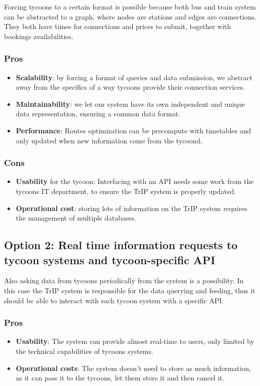 Forcing tycoons to a certain format is possible because both bus and train system can be abstracted to a graph, where nodes are stations and edges are connections.
They both have times for connections and prices to submit, together with bookings availabilities.
\subsubsection*{Pros}
\begin{itemize}[noitemsep]
    \item \textbf{Scalability}: by forcing a format of queries and data submission, we abstract away from the specifics of a way tycoons provide their connection services.
    \item \textbf{Maintainability}: we let our system have its own independent and unique data representation, ensuring a common data format.
    \item \textbf{Performance}: Routes optimization can be precompute with timetables and only updated when new information come from the tycoond.
\end{itemize}
\subsubsection*{Cons}
\begin{itemize}[noitemsep]
    \item \textbf{Usability} for the tycoon: Interfacing with an API needs some work from the tycoons IT department, to ensure the TrIP system is properly updated.
    \item \textbf{Operational cost}: storing lots of information on the TrIP system requires the management of multiple databases.
\end{itemize}


\subsection*{Option 2: Real time information requests to tycoon systems and tycoon-specific API}
Also asking data from tycoons periodically from the system is a possibility. In this case the TrIP system is
responsible for the data querying and feeding, thus it should be able to interact with each tycoon system with a specific API.
\subsubsection*{Pros}
\begin{itemize}[noitemsep]
    \item \textbf{Usability}: The system can provide almost real-time to users, only limited by the technical capabilities of tycoons systems.
    \item \textbf{Operational costs}: The system doesn't need to store as much information, as it can pass it to the tycoons, let them store it and then cancel it.
\end{itemize}
